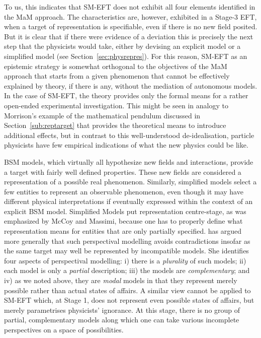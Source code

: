 To us, this indicates that SM-EFT does not exhibit all four elements identified in the MaM approach. 
The characteristics are, however, exhibited in a Stage-3 EFT, when a target of representation is specifiable, even if there is no new field posited.  
But it is clear that if there were evidence of a deviation this is precisely the next step that the physicists would take, either by devising an explicit model or a simplified model (see Section~\ref{sec:physrepres}). 
For this reason, SM-EFT as an epistemic strategy is somewhat orthogonal to the objectives of the MaM approach that starts from a given phenomenon that cannot be effectively explained by theory, if there is any, without the mediation of autonomous models. In the case of SM-EFT, the theory provides only the formal means for a rather open-ended experimental investigation. 
This might be seen in analogy to Morrison's example of the mathematical pendulum discussed in Section~\ref{sub:reptarget} that provides the theoretical means to introduce additional effects, but in contrast to this well-understood de-idealisation, particle physicists have few empirical indications of what the new physics could be like.

BSM models, which virtually all hypothesize new fields and interactions, provide a target with fairly well defined properties. 
These new fields are considered a representation of a possible real phenomenon.
Similarly, simplified models select a few entities to represent an observable phenomenon, even though it may have different physical interpretations if eventually expressed within the context of an explicit BSM model.
Simplified Models put representation centre-stage, as was emphasized by McCoy and Massimi, because one has to properly define what representation means for entities that are only partially specified. 
\citet{massimi2018} has argued more generally that such perspectival modelling avoids contradictions insofar as the same target may well be represented by incompatible models. 
She identifies four aspects of perspectival modelling: i) there is a \textit{plurality} of such models; ii) each model is only a \textit{partial} description; iii) the models are \textit{complementary}; and iv) as we noted above, they are \textit{modal} models in that they represent merely possible rather than actual states of affairs. 
A similar view cannot be applied to SM-EFT which, at Stage 1, does not represent even possible states of affairs, but merely parametrises physicists' ignorance. 
At this stage, there is no group of partial, complementary models along which one can take various incomplete perspectives on a space of possibilities. 

